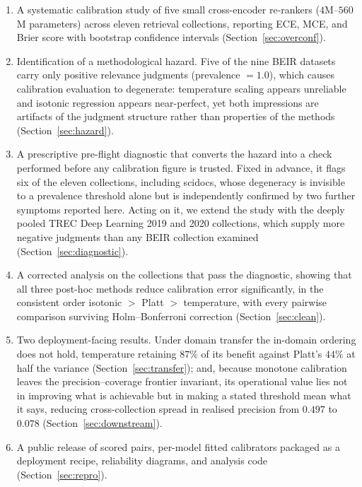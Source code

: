 \documentclass[sn-mathphys-num,pdflatex]{sn-jnl}
\begin{document}
\begin{enumerate}[label=\textbf{C\arabic*.},leftmargin=*,itemsep=3pt]
  \item A systematic calibration study of five small cross-encoder re-rankers
  ($4$M--$560$M parameters) across eleven retrieval collections, reporting ECE, MCE,
  and Brier score with bootstrap confidence intervals
  (Section~\ref{sec:overconf}).

  \item Identification of a methodological hazard. Five of the nine BEIR datasets
  carry only positive relevance judgments (prevalence $=1.0$), which causes
  calibration evaluation to degenerate: temperature scaling appears unreliable
  and isotonic regression appears near-perfect, yet both impressions are
  artifacts of the judgment structure rather than properties of the methods
  (Section~\ref{sec:hazard}).

  \item A prescriptive pre-flight diagnostic that converts the hazard into a
  check performed before any calibration figure is trusted. Fixed in advance, it
  flags six of the eleven collections, including scidocs, whose degeneracy is
  invisible to a prevalence threshold alone but is independently confirmed by two
  further symptoms reported here. Acting on it, we extend the study with the
  deeply pooled TREC Deep Learning 2019 and 2020 collections, which supply more
  negative judgments than any BEIR collection examined
  (Section~\ref{sec:diagnostic}).

  \item A corrected analysis on the collections that pass the diagnostic, showing
  that all three post-hoc methods reduce calibration error significantly, in the
  consistent order isotonic $>$ Platt $>$ temperature, with every pairwise
  comparison surviving Holm--Bonferroni correction (Section~\ref{sec:clean}).

  \item Two deployment-facing results. Under domain transfer the in-domain
  ordering does not hold, temperature retaining $87\%$ of its benefit against
  Platt's $44\%$ at half the variance (Section~\ref{sec:transfer}); and, because
  monotone calibration leaves the precision--coverage frontier invariant, its
  operational value lies not in improving what is achievable but in making a stated
  threshold mean what it says, reducing cross-collection spread in realised
  precision from $0.497$ to $0.078$ (Section~\ref{sec:downstream}).

  \item A public release of scored pairs, per-model fitted calibrators packaged
  as a deployment recipe, reliability diagrams, and analysis code
  (Section~\ref{sec:repro}).
\end{enumerate}
\end{document}
